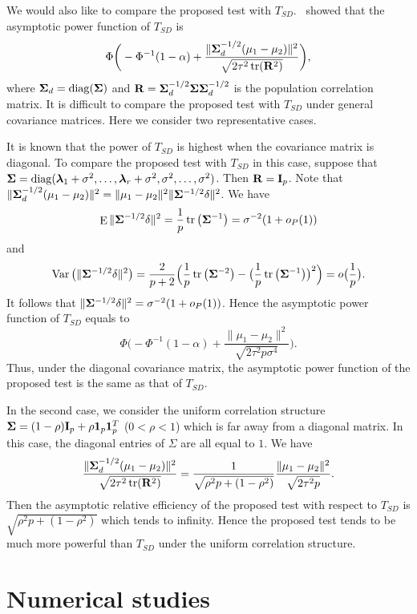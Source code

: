 \documentclass[3p]{elsarticle}
\DeclareMathOperator{\mytr}{tr}
\DeclareMathOperator{\mydiag}{diag}
\DeclareMathOperator{\myE}{E}
\DeclareMathOperator{\myVar}{Var}
\newcommand{\bfsym}[1]{\ensuremath{\boldsymbol{#1}}}
\def\blambda {\bfsym {\lambda}}        \def\bLambda {\bfsym {\Lambda}}
\theoremstyle{plain}
\theoremstyle{definition}
\theoremstyle{remark}
\begin{document}
 We would also like to compare the proposed test with $T_{SD}$.~\cite{Srivastava2008A} showed that the asymptotic power function of $T_{SD}$ is
 $$
        \Phi\bigg(-\Phi^{-1}(1-\alpha)+\frac{\|\bSigma_d^{-1/2}(\mu_1-\mu_2)\|^2}{\sqrt{2\tau^2\mytr(\BR^2)}}\bigg),
 $$
 where $\bSigma_d=\mydiag(\bSigma)$ and $\BR=\bSigma_d^{-1/2} \bSigma \bSigma_d^{-1/2}$ is the population correlation matrix.
 It is difficult to compare the proposed test with $T_{SD}$ under general covariance matrices.
 Here we consider two representative cases.


 It is known that the power of $T_{SD}$ is highest when the covariance matrix is diagonal.
 To compare the proposed test with $T_{SD}$ in this case,
suppose that $\bSigma=\mydiag(\blambda_1+\sigma^2,\ldots,\blambda_r+\sigma^2,\sigma^2,\ldots,\sigma^2)$. Then $\mathbf{R}=\mathbf{I}_p$.
 Note that $\|\bSigma_d^{-1/2}(\mu_1-\mu_2)\|^2=\|\mu_1-\mu_2\|^2 \|\bSigma^{-1/2}\delta\|^2$.
 We have 
 $$\myE\|\bSigma^{-1/2}\delta\|^2=
 \frac{1}{p}\mytr\big(\bSigma^{-1}\big)
 =\sigma^{-2} (1+o_P(1))
 $$
and
 $$
 \myVar\big( \|\bSigma^{-1/2}\delta\|^2 \big)=\frac{2}{p+2}\Big(\frac{1}{p}\mytr\big(\bSigma^{-2}\big)-\big(\frac{1}{p}\mytr\big(\bSigma^{-1}\big)\big)^2\Big)=o\big(\frac{1}{p}\big).$$
It follows that $\|\bSigma^{-1/2}\delta\|^2=\sigma^{-2}(1+o_P(1))$. Hence the asymptotic power function of $T_{SD}$ equals to
 $$
        \Phi\bigg(-\Phi^{-1}(1-\alpha)+\frac{\|\mu_1-\mu_2\|^2}{\sqrt{2\tau^2 p\sigma^4}}\bigg).
 $$
 Thus, under the diagonal covariance matrix, the asymptotic power function of the proposed test is the same as that of $T_{SD}$.

In the second case, we consider the uniform correlation structure $\bSigma=(1-\rho)\BI_p+\rho \mathbf{1}_p\mathbf{1}_p^T$ ($0<\rho <1$) which is far away from a diagonal matrix.
 In this case, the diagonal entries of $\Sigma$ are all equal to $1$. 
 We have
 $$
 \frac{\|\bSigma_d^{-1/2}(\mu_1-\mu_2)\|^2}{\sqrt{2\tau^2\mytr(\BR^2)}}
 =
 \frac{1}{\sqrt{\rho^2 p +(1-\rho^2)}}\frac{\|\mu_1-\mu_2\|^2}{\sqrt{2\tau^2p}}.
 $$
 Then the asymptotic relative efficiency of the proposed test with respect to $T_{SD}$ is
 $\sqrt{\rho^2 p +(1-\rho^2)}$ which tends to infinity.
 Hence the proposed test tends to be much more powerful than $T_{SD}$ under the uniform correlation structure.






\section{Numerical studies}
\end{document}
